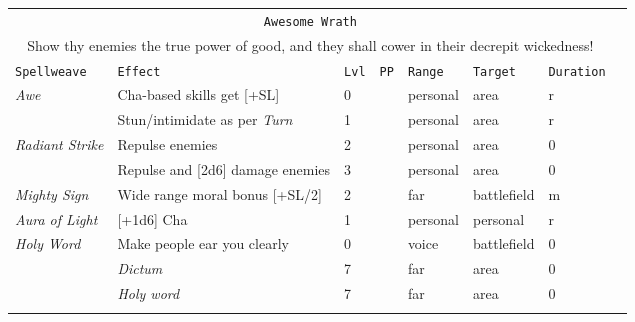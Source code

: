 \documentclass[10pt,a4paper]{article}
\begin{document}
\begin{table}[htbp!]
\begin{tabular}{llllllll}
	
	\multicolumn{7}{c}{\texttt{Awesome Wrath}}\\
	\multicolumn{7}{c}{Show thy enemies the true power of good, and they shall cower in their decrepit wickedness!}\\
    \hline
    \texttt{Spellweave} & \texttt{Effect} & \texttt{Lvl} & \texttt{PP} & \texttt{Range} & \texttt{Target} & \texttt{Duration} \\
    \hline
    \multirow{1}{*}{\textit{Awe}} & Cha-based skills get [+SL] & 0 && personal & area & r \\							   								 & Stun/intimidate as per \textit{Turn} & 1 && personal & area & r \\	
    \hline
    \multirow{1}{*}{\textit{Radiant Strike}} & Repulse enemies & 2 && personal & area & 0 \\
    											& Repulse and [2d6] damage enemies & 3 && personal & area & 0 \\
    \hline
    \multirow{1}{*}{\textit{Mighty Sign}} & Wide range moral bonus [+SL/2] & 2 && far & battlefield & m \\
    \hline
    \multirow{1}{*}{\textit{Aura of Light}} & [+1d6] Cha & 1 && personal & personal & r \\
    \hline
    \multirow{1}{*}{\textit{Holy Word}} & Make people ear you clearly & 0 && voice & battlefield & 0 \\
									   & \textit{Dictum} & 7 && far & area & 0 \\
									   & \textit{Holy word} & 7 && far & area & 0 \\
	&&&&&&\\
\end{tabular}
\end{table} 
\end{document}
